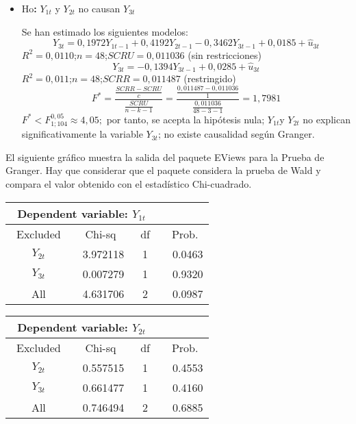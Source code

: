 \begin{itemize}
      \item Ho\textbf{: }$Y_{1t}$ y $Y_{2t}$ no causan $Y_{3t}$

Se han estimado los siguientes modelos:
\[
Y_{3t}=0,1972Y_{1t-1}+0,4192Y_{2t-1}-0,3462Y_{3t-1}+
0,0185+\hat{u}_{3t}
\]
$R^{2}=0,0110$;\quad $n=48$;\quad $SCRU=0,011036$ (sin restricciones)
\[
Y_{3t}=-0,1394Y_{3t-1}+0,0285+\hat{u}_{3t}
\]
$R^{2}=0,011$;\quad $n=48$;\quad $SCRR=0,011487$ (restringido)
\[
F^{\ast }=\frac{\frac{SCRR-SCRU}{c}}{\frac{SCRU}{n-k-1}}=\frac{\frac{\mathrm{0,011487}-\mathrm{0,011036}}{1}}{\frac{\mathrm{0,011036}}{48-3-1}}=1,7981
\]
$F^{\ast }<F_{1;104}^{0,05}\approx 4,05;$ por tanto, se acepta la hip\'{o}tesis nula; $Y_{1t}$y $Y_{2t}$ no explican significativamente la variable $Y_{3t}$; no existe causalidad seg\'{u}n Granger.
\end{itemize}

El siguiente gr\'{a}fico muestra la salida del paquete EViews para la Prueba de Granger. Hay que considerar que el paquete considera la prueba de Wald y compara el valor obtenido con el estad\'{i}stico Chi-cuadrado.

\begin{table}[H]
\centering
\begin{tabular}{cccc}
\multicolumn{4}{l}{~Dependent variable: $Y_{1t}$} \\ \hline\hline
~Excluded~ & ~Chi-sq~ & ~df~ & ~Prob.~ \\ \hline\hline
$Y_{2t}$ & ~3.972118 & 1 & ~0.0463 \\ 
$Y_{3t}$ & ~0.007279 & 1 & ~0.9320 \\ \hline\hline
All & ~4.631706 & 2 & ~0.0987 \\ \hline\hline
\end{tabular}
\end{table}

\begin{table}[H]
\centering
\begin{tabular}{cccc}
\multicolumn{4}{l}{~Dependent variable: $Y_{2t}$} \\ \hline\hline
~Excluded~ & ~Chi-sq~ & ~df~ & ~Prob.~ \\ \hline\hline
$Y_{2t}$ & ~0.557515 & 1 & ~0.4553 \\ 
$Y_{3t}$ & ~0.661477 & 1 & ~0.4160 \\ \hline\hline
All & ~0.746494 & 2 & ~0.6885 \\ \hline\hline
\end{tabular}
\end{table}

